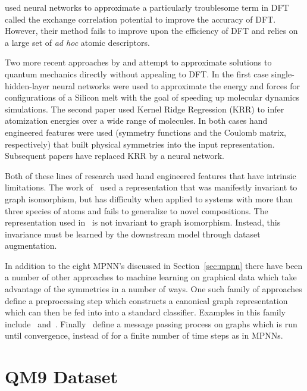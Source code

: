 \documentclass{article}
\begin{document}
\citet{hu2003} used neural networks to approximate a particularly troublesome term in DFT called the exchange correlation potential to improve the accuracy of DFT. However, their method fails to improve upon the efficiency of DFT and relies on a large set of \textit{ad hoc} atomic descriptors.

Two more recent approaches by \citet{behler2007} and \citet{coloumb} attempt to approximate solutions to quantum mechanics directly without appealing to DFT. In the first case single-hidden-layer neural networks were used to approximate the energy and forces for configurations of a Silicon melt with the goal of speeding up molecular dynamics simulations. The second paper used Kernel Ridge Regression (KRR) to infer atomization energies over a wide range of molecules. In both cases hand engineered features were used (symmetry functions and the Coulomb matrix, respectively) that built physical symmetries into the input representation. Subsequent papers have replaced KRR by a neural network.

Both of these lines of research used hand engineered features that have intrinsic limitations. The work of~\citet{behler2007} used a representation that was manifestly invariant to graph isomorphism, but has difficulty when applied to systems with more than three species of atoms and fails to generalize to novel compositions. The representation used in~\citet{coloumb} is not invariant to graph isomorphism. Instead, this invariance must be learned by the downstream model through dataset augmentation.


In addition to the eight MPNN’s discussed in Section~\ref{sec:mpnn} there have been a number of other approaches to machine learning on graphical data which take advantage of the symmetries in a number of ways. One such family of approaches define a preprocessing step which constructs a canonical graph representation which can then be fed into into a standard classifier. Examples in this family include~\citet{niepert2016learning} and~\citet{coloumb}. Finally~\citet{scarselli2009graph} define a message passing process on graphs which is run until convergence, instead of for a finite number of time steps as in MPNNs.







\section{QM9 Dataset} 
\end{document}
